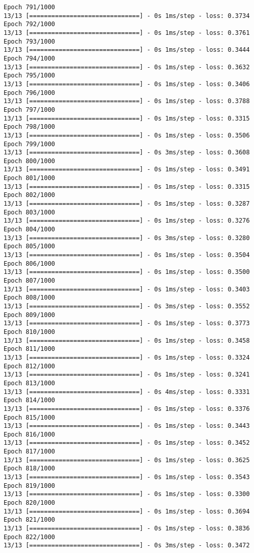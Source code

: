 \documentclass[11pt]{article}
\begin{document}
\begin{Verbatim}[commandchars=\\\{\}]
Epoch 791/1000
13/13 [==============================] - 0s 1ms/step - loss: 0.3734
Epoch 792/1000
13/13 [==============================] - 0s 1ms/step - loss: 0.3761
Epoch 793/1000
13/13 [==============================] - 0s 1ms/step - loss: 0.3444
Epoch 794/1000
13/13 [==============================] - 0s 1ms/step - loss: 0.3632
Epoch 795/1000
13/13 [==============================] - 0s 1ms/step - loss: 0.3406
Epoch 796/1000
13/13 [==============================] - 0s 1ms/step - loss: 0.3788
Epoch 797/1000
13/13 [==============================] - 0s 1ms/step - loss: 0.3315
Epoch 798/1000
13/13 [==============================] - 0s 1ms/step - loss: 0.3506
Epoch 799/1000
13/13 [==============================] - 0s 3ms/step - loss: 0.3608
Epoch 800/1000
13/13 [==============================] - 0s 1ms/step - loss: 0.3491
Epoch 801/1000
13/13 [==============================] - 0s 1ms/step - loss: 0.3315
Epoch 802/1000
13/13 [==============================] - 0s 1ms/step - loss: 0.3287
Epoch 803/1000
13/13 [==============================] - 0s 1ms/step - loss: 0.3276
Epoch 804/1000
13/13 [==============================] - 0s 3ms/step - loss: 0.3280
Epoch 805/1000
13/13 [==============================] - 0s 1ms/step - loss: 0.3504
Epoch 806/1000
13/13 [==============================] - 0s 1ms/step - loss: 0.3500
Epoch 807/1000
13/13 [==============================] - 0s 1ms/step - loss: 0.3403
Epoch 808/1000
13/13 [==============================] - 0s 3ms/step - loss: 0.3552
Epoch 809/1000
13/13 [==============================] - 0s 1ms/step - loss: 0.3773
Epoch 810/1000
13/13 [==============================] - 0s 1ms/step - loss: 0.3458
Epoch 811/1000
13/13 [==============================] - 0s 1ms/step - loss: 0.3324
Epoch 812/1000
13/13 [==============================] - 0s 1ms/step - loss: 0.3241
Epoch 813/1000
13/13 [==============================] - 0s 4ms/step - loss: 0.3331
Epoch 814/1000
13/13 [==============================] - 0s 1ms/step - loss: 0.3376
Epoch 815/1000
13/13 [==============================] - 0s 1ms/step - loss: 0.3443
Epoch 816/1000
13/13 [==============================] - 0s 1ms/step - loss: 0.3452
Epoch 817/1000
13/13 [==============================] - 0s 1ms/step - loss: 0.3625
Epoch 818/1000
13/13 [==============================] - 0s 1ms/step - loss: 0.3543
Epoch 819/1000
13/13 [==============================] - 0s 1ms/step - loss: 0.3300
Epoch 820/1000
13/13 [==============================] - 0s 1ms/step - loss: 0.3694
Epoch 821/1000
13/13 [==============================] - 0s 1ms/step - loss: 0.3836
Epoch 822/1000
13/13 [==============================] - 0s 3ms/step - loss: 0.3472

\end{Verbatim}
\end{document}
